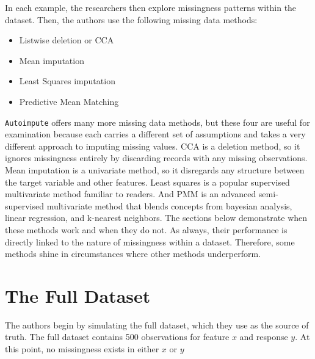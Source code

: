 \documentclass[12pt,oneside]{chicagocapstone}
\providecommand{\tightlist}{%
  \setlength{\itemsep}{0pt}\setlength{\parskip}{0pt}}
\begin{document}
In each example, the researchers then explore missingness patterns
within the dataset. Then, the authors use the following missing data
methods:
\begin{itemize}
\tightlist
\item
  Listwise deletion or CCA
\item
  Mean imputation
\item
  Least Squares imputation
\item
  Predictive Mean Matching
\end{itemize}
\texttt{Autoimpute} offers many more missing data methods, but these
four are useful for examination because each carries a different set of
assumptions and takes a very different approach to imputing missing
values. CCA is a deletion method, so it ignores missingness entirely by
discarding records with any missing observations. Mean imputation is a
univariate method, so it disregards any structure between the target
variable and other features. Least squares is a popular supervised
multivariate method familiar to readers. And PMM is an advanced
semi-supervised multivariate method that blends concepts from bayesian
analysis, linear regression, and k-nearest neighbors. The sections below
demonstrate when these methods work and when they do not. As always,
their performance is directly linked to the nature of missingness within
a dataset. Therefore, some methods shine in circumstances where other
methods underperform.

\section*{The Full Dataset}\label{the-full-dataset}

The authors begin by simulating the full dataset, which they use as the
source of truth. The full dataset contains 500 observations for feature
\(x\) and response \(y\). At this point, no missingness exists in either
\(x\) or \(y\)
\end{document}
